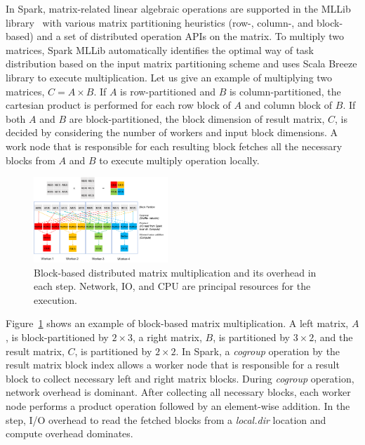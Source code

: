 \documentclass[10pt, conference, compsocconf]{IEEEtran}
\begin{document}
In Spark, matrix-related linear algebraic operations are supported in the MLLib library~\cite{spark-mm} with various matrix partitioning heuristics (row-, column-, and block-based) and a set of distributed operation APIs on the matrix. To multiply two matrices, Spark MLLib automatically identifies the optimal way of task distribution based on the input matrix partitioning scheme and uses Scala Breeze library to execute multiplication. Let us give an example of multiplying two matrices, $C = A \times B$. If $A$ is row-partitioned and $B$ is column-partitioned, the cartesian product is performed for each row block of $A$ and column block of $B$. If both $A$ and $B$ are block-partitioned, the block dimension of result matrix, $C$, is decided by considering the number of workers and input block dimensions. A work node that is responsible for each resulting block fetches all the necessary blocks from $A$ and $B$ to execute multiply operation locally.

\begin{figure}
  \centering\includegraphics[width=0.45\textwidth]{figures/matmult-overhead-non-square.pdf}\caption{Block-based distributed matrix multiplication and its overhead in each step. Network, IO, and CPU are principal resources for the execution.}\label{fig:matmul-with-overhead}
\end{figure}
Figure~\ref{fig:matmul-with-overhead} shows an example of block-based matrix multiplication. A left matrix, $A$, is block-partitioned by $2 \times 3$, a right matrix, $B$, is partitioned by $3 \times 2$, and the result matrix, $C$, is partitioned by $2 \times 2$. In Spark, a \textit{cogroup} operation by the result matrix block index allows a worker node that is responsible for a result block to collect necessary left and right matrix blocks. During \textit{cogroup} operation, network overhead is dominant. After collecting all necessary blocks, each worker node performs a product operation followed by an element-wise addition. In the step, I/O overhead to read the fetched blocks from a \textit{local.dir} location and compute overhead dominates.
\end{document}
